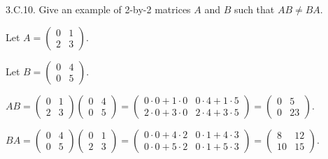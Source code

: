 \documentclass[a5paper]{article}
\begin{document}
\newcommand   \C           {\mathbf{C}}
\newcommand   \R           {\mathbf{R}}
\renewcommand \L           {\mathcal{L}}
\newcommand   \F           {\mathbf{F}}
\renewcommand \P           {\mathcal{P}}
\newcommand   \M           {\mathcal{M}}
\newcommand   \op          {\operatorname}


    3.C.10.
    Give an example of 2-by-2 matrices $A$ and $B$ such that $AB \neq BA$.

    Let $A = \begin{pmatrix}
        0 & 1 \\
        2 & 3
    \end{pmatrix}$.

    Let $B = \begin{pmatrix}
        0 & 4 \\
        0 & 5
    \end{pmatrix}$.

    $AB = \begin{pmatrix}
        0 & 1 \\
        2 & 3
    \end{pmatrix}\begin{pmatrix}
        0 & 4 \\
        0 & 5
    \end{pmatrix} = \begin{pmatrix}
        0 \cdot 0 + 1 \cdot 0 & 0 \cdot 4 + 1 \cdot 5 \\
        2 \cdot 0 + 3 \cdot 0 & 2 \cdot 4 + 3 \cdot 5
    \end{pmatrix} = \begin{pmatrix}
        0 &  5 \\
        0 & 23
    \end{pmatrix}$.

    $BA = \begin{pmatrix}
        0 & 4 \\
        0 & 5
    \end{pmatrix}\begin{pmatrix}
        0 & 1 \\
        2 & 3
    \end{pmatrix} = \begin{pmatrix}
        0 \cdot 0 + 4 \cdot 2 & 0 \cdot 1 + 4 \cdot 3 \\
        0 \cdot 0 + 5 \cdot 2 & 0 \cdot 1 + 5 \cdot 3
    \end{pmatrix} = \begin{pmatrix}
         8 & 12 \\
        10 & 15
    \end{pmatrix}$.
\end{document}
